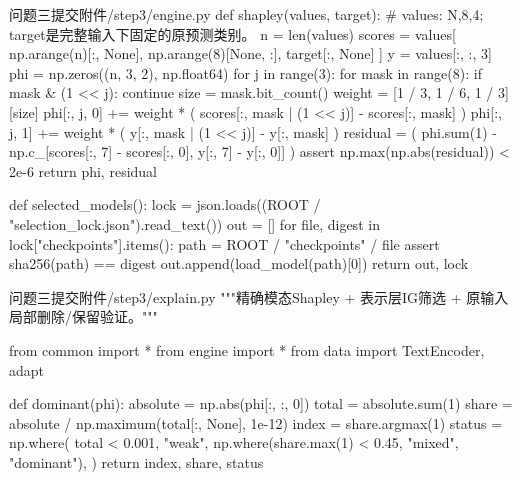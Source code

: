\begin{appendices}
\begin{Python}{问题三提交附件/step3/engine.py}
def shapley(values, target):
    # values: N,8,4; target是完整输入下固定的原预测类别。
    n = len(values)
    scores = values[
        np.arange(n)[:, None], np.arange(8)[None, :], target[:, None]
    ]
    y = values[:, :, 3]
    phi = np.zeros((n, 3, 2), np.float64)
    for j in range(3):
        for mask in range(8):
            if mask & (1 << j):
                continue
            size = mask.bit_count()
            weight = [1 / 3, 1 / 6, 1 / 3][size]
            phi[:, j, 0] += weight * (
                scores[:, mask | (1 << j)] - scores[:, mask]
            )
            phi[:, j, 1] += weight * (
                y[:, mask | (1 << j)] - y[:, mask]
            )
    residual = (
        phi.sum(1)
        - np.c_[scores[:, 7] - scores[:, 0], y[:, 7] - y[:, 0]]
    )
    assert np.max(np.abs(residual)) < 2e-6
    return phi, residual


def selected_models():
    lock = json.loads((ROOT / "selection_lock.json").read_text())
    out = []
    for file, digest in lock["checkpoints"].items():
        path = ROOT / "checkpoints" / file
        assert sha256(path) == digest
        out.append(load_model(path)[0])
    return out, lock
\end{Python}

\vspace{2ex}

\begin{Python}{问题三提交附件/step3/explain.py}
"""精确模态Shapley + 表示层IG筛选 + 原输入局部删除/保留验证。"""

from common import *
from engine import *
from data import TextEncoder, adapt


def dominant(phi):
    absolute = np.abs(phi[:, :, 0])
    total = absolute.sum(1)
    share = absolute / np.maximum(total[:, None], 1e-12)
    index = share.argmax(1)
    status = np.where(
        total < 0.001,
        "weak",
        np.where(share.max(1) < 0.45, "mixed", "dominant"),
    )
    return index, share, status



\end{Python}
\end{appendices}
